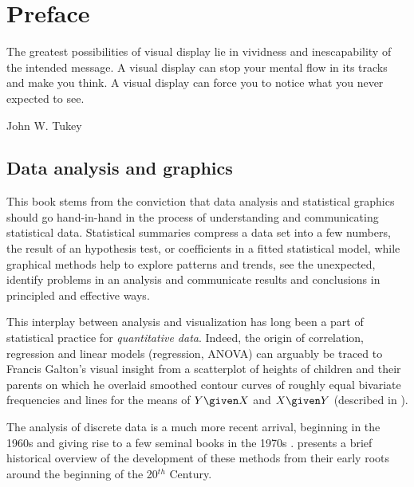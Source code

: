 \chapter*{Preface}


\epigraph{The greatest possibilities of visual display lie in vividness and inescapability of the intended message.
A visual display can stop your mental flow in its tracks and make you think.
A visual display can force you to notice what you never expected to see.}{John W. Tukey \cite{Tukey:90}}



\section*{Data analysis and graphics}

This book stems from the conviction that data analysis and statistical graphics should
go hand-in-hand in the process of understanding and communicating statistical data.
Statistical summaries compress a data set into a few numbers, the result of an
hypothesis test, or coefficients in a fitted statistical model,
while graphical methods help to explore patterns and trends, see the unexpected,
identify problems in an analysis and communicate results and conclusions in 
principled and effective ways. 

This interplay between analysis and visualization has long been a part of 
statistical practice for \emph{quantitative data}.  Indeed, the origin
of correlation, regression and linear models (regression, ANOVA) can
arguably be traced to Francis Galton's \citeyearpar{Galton:1886}
visual insight from a scatterplot of heights of children and their parents
on which he overlaid smoothed contour curves of roughly equal bivariate frequencies
and lines for the means of $Y \given X$ and $X \given Y$
(described in \citet{FriendlyDenis:05:scat,Friendly-etal:ellipses:2013}).

The analysis of discrete data is a much more recent arrival, beginning in the
1960s and giving rise to a few seminal books in the 1970s
\citep{Bishop-etal:75,Haberman:74, Goodman:1978,Fienberg:80}.
\citet[]{Agresti:2013} presents a brief historical overview of the
development of these methods from their early roots around the beginning
of the 20$^{th}$ Century.

